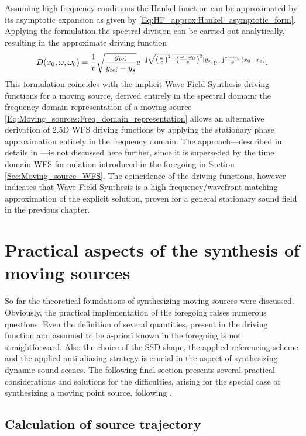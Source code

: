 Assuming high frequency conditions the Hankel function can be approximated by its asymptotic expansion as given by \eqref{Eq:HF_approx:Hankel_asymptotic_form}.
Applying the formulation the spectral division can be carried out analytically, resulting in the approximate driving function
\begin{equation}
D(x_0,\omega,\omega_0) = 
\frac{1}{v}
\sqrt{\frac{y_{\mathrm{ref}}}{y_{\mathrm{ref}}- y_s}}
\mathrm{e}^{-\mathrm{j} \sqrt{ \left(\frac{\omega}{c}\right)^2 - \left( \frac{\omega-\omega_0}{v} \right)^2}|y_s|}
\mathrm{e}^{-\mathrm{j} \frac{\omega-\omega_0}{v} (x_0 - x_s)}.
\end{equation}
This formulation coincides with the implicit Wave Field Synthesis driving functions for a moving source, derived entirely in the spectral domain: 
the frequency domain representation of a moving source \eqref{Eq:Moving_sources:Freq_domain_representation} allows an alternative derivation of 2.5D WFS driving functions by applying the stationary phase approximation entirely in the frequency domain.
The approach---described in details in \cite{firtha2015sound}---is not discussed here further, since it is superseded by the time domain WFS formulation introduced in the foregoing in Section \ref{Sec:Moving_source_WFS}.
The coincidence of the driving functions, however indicates that Wave Field Synthesis is a high-frequency/wavefront matching approximation of the explicit solution, proven for a general stationary sound field in the previous chapter.

\section{Practical aspects of the synthesis of moving sources}

So far the theoretical foundations of synthesizing moving sources were discussed.
Obviously, the practical implementation of the foregoing raises numerous questions.
Even the definition of several quantities, present in the driving function and assumed to be a-priori known in the foregoing is not straightforward.
Also the choice of the SSD shape, the applied referencing scheme and the applied anti-aliasing strategy is crucial in the aspect of synthesizing dynamic sound scenes.
The following final section presents several practical considerations and solutions for the difficulties, arising for the special case of synthesizing a moving point source, following \cite{Firtha2018_daga_moving_source}.

\subsection{Calculation of source trajectory}

